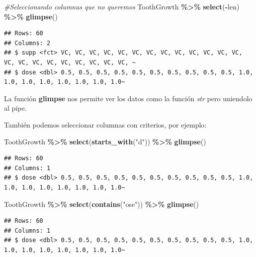 \documentclass[
]{book}
\newenvironment{Shaded}{\begin{snugshade}}{\end{snugshade}}
\newcommand{\CommentTok}[1]{\textcolor[rgb]{0.56,0.35,0.01}{\textit{#1}}}
\newcommand{\FunctionTok}[1]{\textcolor[rgb]{0.13,0.29,0.53}{\textbf{#1}}}
\newcommand{\NormalTok}[1]{#1}
\newcommand{\SpecialCharTok}[1]{\textcolor[rgb]{0.81,0.36,0.00}{\textbf{#1}}}
\newcommand{\StringTok}[1]{\textcolor[rgb]{0.31,0.60,0.02}{#1}}
\begin{document}
\begin{Shaded}
\begin{Highlighting}[]
\CommentTok{\#Seleccionando columnas que no queremos}
\NormalTok{ToothGrowth }\SpecialCharTok{\%\textgreater{}\%} \FunctionTok{select}\NormalTok{(}\SpecialCharTok{{-}}\NormalTok{len) }\SpecialCharTok{\%\textgreater{}\%} \FunctionTok{glimpse}\NormalTok{()}
\end{Highlighting}
\end{Shaded}

\begin{verbatim}
## Rows: 60
## Columns: 2
## $ supp <fct> VC, VC, VC, VC, VC, VC, VC, VC, VC, VC, VC, VC, VC, VC, VC, VC, VC, VC, VC, VC, VC, VC, ~
## $ dose <dbl> 0.5, 0.5, 0.5, 0.5, 0.5, 0.5, 0.5, 0.5, 0.5, 0.5, 1.0, 1.0, 1.0, 1.0, 1.0, 1.0, 1.0, 1.0~
\end{verbatim}

La función \textbf{glimpse} nos permite ver los datos como la función \emph{str} pero uniendolo al pipe.

También podemos seleccionar columnas con criterios, por ejemplo:\\

\begin{Shaded}
\begin{Highlighting}[]
\NormalTok{ToothGrowth }\SpecialCharTok{\%\textgreater{}\%} \FunctionTok{select}\NormalTok{(}\FunctionTok{starts\_with}\NormalTok{(}\StringTok{"d"}\NormalTok{)) }\SpecialCharTok{\%\textgreater{}\%} \FunctionTok{glimpse}\NormalTok{()}
\end{Highlighting}
\end{Shaded}

\begin{verbatim}
## Rows: 60
## Columns: 1
## $ dose <dbl> 0.5, 0.5, 0.5, 0.5, 0.5, 0.5, 0.5, 0.5, 0.5, 0.5, 1.0, 1.0, 1.0, 1.0, 1.0, 1.0, 1.0, 1.0~
\end{verbatim}

\begin{Shaded}
\begin{Highlighting}[]
\NormalTok{ToothGrowth }\SpecialCharTok{\%\textgreater{}\%} \FunctionTok{select}\NormalTok{(}\FunctionTok{contains}\NormalTok{(}\StringTok{"ose"}\NormalTok{)) }\SpecialCharTok{\%\textgreater{}\%} \FunctionTok{glimpse}\NormalTok{()}
\end{Highlighting}
\end{Shaded}

\begin{verbatim}
## Rows: 60
## Columns: 1
## $ dose <dbl> 0.5, 0.5, 0.5, 0.5, 0.5, 0.5, 0.5, 0.5, 0.5, 0.5, 1.0, 1.0, 1.0, 1.0, 1.0, 1.0, 1.0, 1.0~
\end{verbatim}
\end{document}
